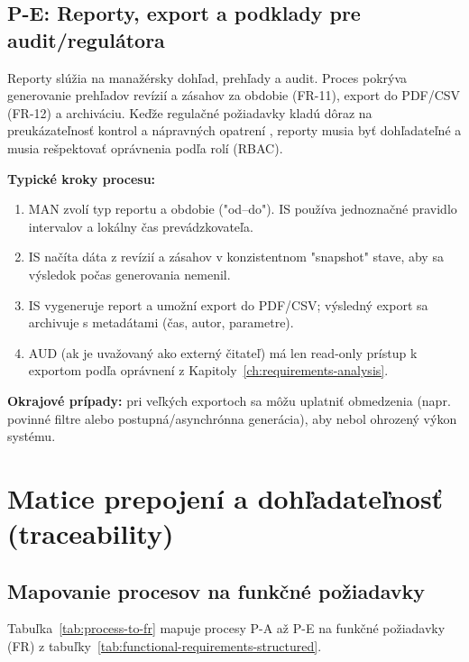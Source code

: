 \subsection{P-E: Reporty, export a podklady pre audit/regulátora}
\label{sec:process-pe}

Reporty slúžia na manažérsky dohľad, prehľady a audit.
Proces pokrýva generovanie prehľadov revízií a zásahov za obdobie (FR-11), export do PDF/CSV (FR-12) a archiváciu.
Keďže regulačné požiadavky kladú dôraz na preukázateľnosť kontrol a nápravných opatrení \cite{EUDWD2020,SKVyhlaska912023}, reporty musia byť dohľadateľné a musia rešpektovať oprávnenia podľa rolí (RBAC).

\textbf{Typické kroky procesu:}
\begin{enumerate}[label=\arabic*.]
\item MAN zvolí typ reportu a obdobie ("od--do"). IS používa jednoznačné pravidlo intervalov a lokálny čas prevádzkovateľa.
\item IS načíta dáta z revízií a zásahov v konzistentnom "snapshot" stave, aby sa výsledok počas generovania nemenil.
\item IS vygeneruje report a umožní export do PDF/CSV; výsledný export sa archivuje s metadátami (čas, autor, parametre).
\item AUD (ak je uvažovaný ako externý čitateľ) má len read-only prístup k exportom podľa oprávnení z Kapitoly~\ref{ch:requirements-analysis}.
\end{enumerate}

\textbf{Okrajové prípady:} pri veľkých exportoch sa môžu uplatniť obmedzenia (napr. povinné filtre alebo postupná/asynchrónna generácia), aby nebol ohrozený výkon systému.

\section{Matice prepojení a dohľadateľnosť (traceability)}
\label{sec:traceability}

\subsection{Mapovanie procesov na funkčné požiadavky}

Tabuľka~\ref{tab:process-to-fr} mapuje procesy P-A až P-E na funkčné požiadavky (FR) z tabuľky~\ref{tab:functional-requirements-structured}.

